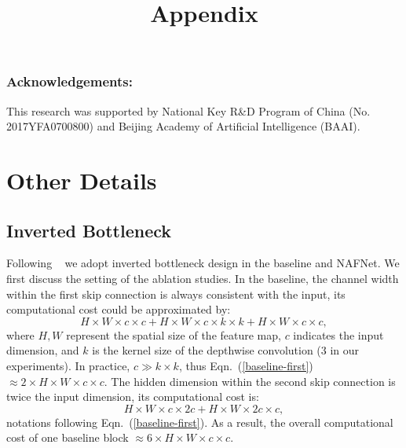 \documentclass[runningheads]{llncs}
\begin{document}
\subsubsection{Acknowledgements:} This research was supported by National Key R\&D Program of China (No. 2017YFA0700800) and Beijing Academy of Artificial Intelligence (BAAI). 

\appendix
\title{Appendix}
\author{}
\institute{}
\maketitle


\section{Other Details}

\subsection{Inverted Bottleneck}
Following ~\cite{liu2022convnet} we adopt inverted bottleneck design in the baseline and NAFNet. We first discuss the setting of the ablation studies.
In the baseline, 
the channel width within the first skip connection is always consistent with the input, its computational cost could be approximated by:
\begin{equation}\label{baseline-first}
H\times W \times c\times c + H\times W \times c \times k \times k + H\times W \times c \times c,
\end{equation}
where $H,W$ represent the spatial size of the feature map, $c$ indicates the input dimension, and $k$ is the kernel size of the depthwise convolution (3 in our experiments). In practice, $c \gg k\times k$, thus Eqn.~(\ref{baseline-first}) $\approx 2\times H\times W\times c\times c$.
The hidden dimension within the second skip connection is twice the input dimension, its computational cost is:
\begin{equation}\label{baseline-second}
H\times W \times c \times 2c + H\times W \times 2c \times c,
\end{equation}
notations following Eqn.~(\ref{baseline-first}). As a result, the overall computational cost of one baseline block $\approx 6\times H\times W\times c \times c$. 
\end{document}
